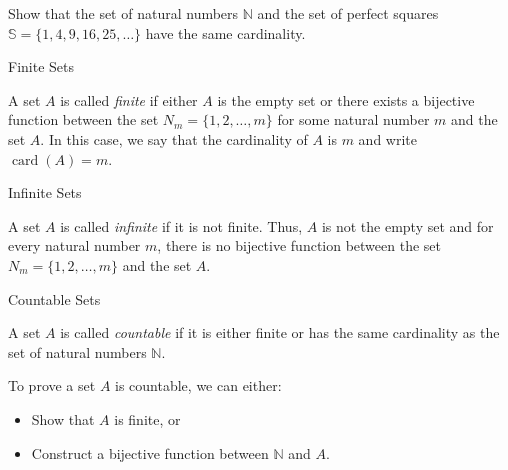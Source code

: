 \documentclass[12pt, a4paper]{article}
\DeclareMathOperator{\card}{card}
\newcommand{\N}{\mathbb{N}}
\begin{document}
\clearpage

\begin{problem}
	Show that the set of natural numbers \(\mathbb{N}\) and the set of perfect squares \(\mathbb{S} = \{1, 4, 9, 16, 25, \ldots\}\) have the same cardinality.
\end{problem}

\clearpage

\begin{heading}
	Finite Sets
\end{heading}
\vspace{10pt}
\begin{definition}
	A set \(A\) is called \textit{finite} if either \(A\) is the empty set or there exists a bijective function between the set \(N_m=\{1, 2, \ldots, m\}\) for some natural number \(m\) and the set \(A\). In this case, we say that the cardinality of \(A\) is \(m\) and write \(\card(A) = m\).
\end{definition}

\clearpage

\begin{heading}
	Infinite Sets
\end{heading}
\vspace{10pt}
\begin{definition}
	A set \(A\) is called \textit{infinite} if it is not finite. Thus, \(A\) is not the empty set and for every natural number \(m\), there is no bijective function between the set \(N_m=\{1, 2, \ldots, m\}\) and the set \(A\).  
\end{definition}

\clearpage

\begin{heading}
	Countable Sets
\end{heading}
\vspace{10pt}
\begin{definition}
	A set \(A\) is called \textit{countable} if it is either finite or has the same cardinality as the set of natural numbers \(\N\).
\end{definition}
\vspace{15pt}
\begin{tcolorbox}[colback=ThmBack, colframe=ThmMain]
	To prove a set \(A\) is countable, we can either:
	\begin{itemize}
		\item Show that \(A\) is finite, or
		\item Construct a bijective function between \(\N\) and \(A\).
	\end{itemize}
\end{tcolorbox}
\end{document}
